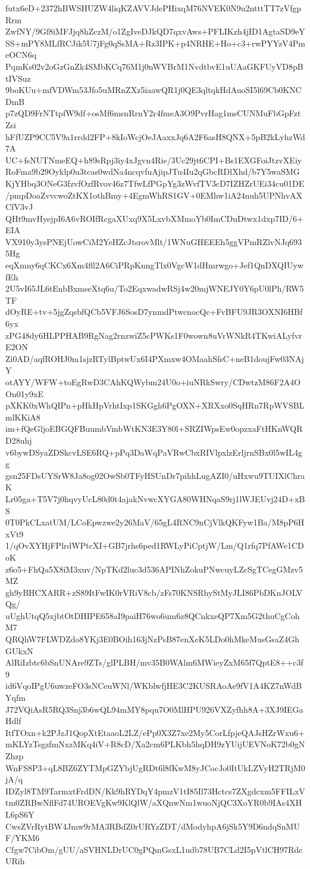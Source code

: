 futx6eD+2372hBWSHUZW4liqKZAVVJdePHixqM76NVEK0N9u2ntttTT7zVfgpRrm
ZwfNY/9Gf8iMFJjq8hZczM/o1ZgIveDJkQD7qxvAws+PFLIKzh4jID1AgtaSD9eY
SS+mPY8MLfRCJik5U7jFg0qSsMA+Rz3IPK+p4NRHE+Ho+c3+rwPYYzV4PmeOCN6q
PqmKs02v2oGzGnZk4SMbKCq76M1j0nWVBrM1NvdtbvE1uUAaGKFUyVD8pBtIVSuz
9boKUu+mfVDWm53Jfo5uMRnZXz5iaawQR1j0QE3qltqkHdAuoSI5l69Cb0KNCDmB
p7zQD9FrNTtpfW9df+osMf6msnRrnY2r4fmeA3O9PvrHag1msCUNMuFbGpFztZsi
hFfUZP9CC5V9a1rrdd2FP+8kIoWcjOeJAaxxJq6A2F6asH8QNX+5pB2kLyhzWd7A
UC+fsNUTNmeEQ+h89sRpj3iy4xJgvn4Rie/3Uc29jt6CPI+Bs1EXGFoiJtzvXEiy
RoFma9b29Oyklp0u3tcas0wdNa4ncqvfuAjipJTu4Iu2qGbcRDlXhd/b7Y5waSMG
KjYHbq3ONeG3fzvfOzfRvov46z7TfwLfPGpYg3zWvfTV3cD7IZHZrUEi34cu01DE
/pmpDoaZvvcwoZtKX1othBmy+4EgmWhRS1GV+0EMhw1iA24nuh5UPNhvAXCfV3vJ
QHt9mvHyejpI6A6vROIfRcgaXUxq9X5LxvbXMmoYb0ImCDuDtwx1dxp7ID/6+EIA
VX910y3ysPNEjUowCiM2YeHZcJtsrovMlt/1WNuGHEEEh5ggVPmRZlvNJq6935Hg
eqXmny6qCKCx6Xm4fll2A6CiPRpKnngTlx0VgcW1dHmrwgo+Jef1QnDXQIUywfEh
2U5vI65JL6tEnbBxmseXtq6u/To2EqxwadwRSj4w20mjWNEJY0Y6pU0lPh/RW5TF
dOyRE+tv+5jgZqsbfQCb5VFJ6SosD7ynmdPtwcnocQc+FvBFU9JR3OXNI6HBf6yx
zPG48dy6HLPPHAB9RgNag2rnzwiZ5cPWKs1F0wown8uVrWNkR4TKwiALyfvrE2ON
Zi0AD/aqfROHJ0m1sjzRTylBptwUx6I4PXmxw4OMaahSfsC+neB1doujFw03NAjY
otAYY/WFW+toEgRwD3CAhKQWybm24U0o+iuNRkSwry/CDwtzM86F2A4OOn01y9xE
pXKK0xWhQIPn+pHkHpVrhtIxp1SKGgh6PgOXN+XRXxo0SqHRn7RpWVSBLmlKKiA8
im+fQeGljoEBGQFBuumbVmbWtKN3E3Y80l+SRZIWpsEw0opzxaFtHKnWQRD28uhj
v6bywDSyaZDSkcvLSE6RQ+pPq3DaWqPaVRwCbxRIVlpxlzErljrnSBx0l5wIL4gg
gsn25FDsUYSrW8Ja8og02OwSb0TFyHSUnDr7pihhLugAZI0/uHxwu9TUIXlChraK
Lr05ga+T5V7j0hqvyUcL80d0t4ajakNvwcXYGA80WHNqaS9rj1lWJEUvj24D+xBS
0T0PkCLxatUM/LCoEpwzwe2y26MaV/65gL4RNC9nCjVlkQKFyw1Ba/M8pP6HxVt9
1/qOvXYHjFPlrdWPtcXI+GB7jrhs6ped1RWLyPiCptjW/Lm/Q1rfq7PfAWe1CDoK
z6o5+FhQa5X8iM3xuv/NpTKd2luc3d536APINhZokuPNwcuyLZcSgTCegGMzv5MZ
gh9yBHCXARR+zS89ItFwIK0rVRiV8cb/zFs70KNSRhyStMyJLI86PbDKnJOLVQg/
uUghUtqQ5xjbtOtDHIPE658aI9paiH76wo6um6z8QCnkxeQP7Xm5G2thuCgCohM7
QRQhW7FLWDZdo8YKj3E0BOih163jNzPsB87enXeK5LDo0hMkeMusGsaZ4GhGUkxN
AlRiIzbtc6bSnUNAre9ZTs/glPLBH/mv35B0WAlm6MWieyZxM65f7QptE8++c3f9
id6VqoIPgU6uwzeFO3sNCeuWNl/WKblwfjHE3C2KUSRAoAe9fV1A4KZ7nWdBYqfm
J72VQiAsR5RQ3Snj3b6wQL94mMY8pqu7O0MlHPU926VXZyfhh8A+3XJ9IEGaHdlf
ItfTOxn+k2PJzJ1QopXtEtaaoL2LZ/ePp0X3Z7xe2My5CorLfpjeQAJsHZrWxu6+
mKLYzTsgzfmNxzMKq4iV+R8cD/Xa2cm6PLKbh5hqDH9zYUijUEVNoK72b0gNZhzp
WnFS8P3+qL8BZ6ZYTMpGZYbjUgRDt6l8fKwM8yJCocJo0ItUkLZVyH2TRjM0jA/q
IDZyl8TM9TarmxtFrdDN/Kk9hRYDqY4pmzV1tI85Il73Hctcs7ZXgdcxm5FFILxV
tm0ZRBwNflFd74UROEVgKw9KlQlW/aXQnwNm1wuoNjQC3XoYR0b9IAs4XHL6pS6Y
CwsZVrRytBW4Jmw9rMA3RBdZ0rURYzZDT/dModyhpA6jSk5Y9D6ndqSnMUF/YKM6
Cfgw7CibOm/gUU/aSVHNLDrUC0gPQmGsxL1udb78UB7CLd2I5pVtlCH97RdcURih
